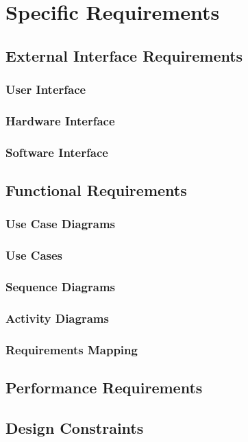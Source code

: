 \chapter{Specific Requirements}

\section{External Interface Requirements}
\subsection{User Interface}
\subsection{Hardware Interface}
\subsection{Software Interface}

\newpage
\section{Functional Requirements}
\subsection{Use Case Diagrams}
\subsection{Use Cases}
\subsection{Sequence Diagrams}
\subsection{Activity Diagrams}
\subsection{Requirements Mapping}

\newpage
\section{Performance Requirements}

\newpage
\section{Design Constraints}
